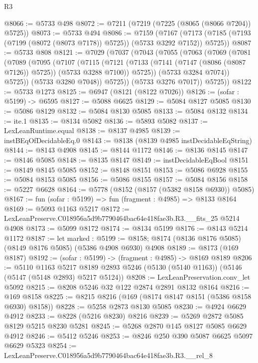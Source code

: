 \begin{lexlean}{R3}
\begin{coremodule}
@8066 := @5733 @498
@8072 := @7211 (@7219 (@7225 (@8065 (@8066 @7204)) @5725))
@8073 := @5733 @494
@8086 := @7159
    (@7167 (@7173 (@7185 (@7193 (@7199 (@8072 (@8073 @7178)) @5725)) (@5733 @3292 @7152)) @5725))
@8087 := @5733 @808
@8121 := @7029
    (@7037
      (@7043
        (@7055
          (@7063
            (@7069
              (@7081
                (@7089
                  (@7095
                    (@7107
                      (@7115
                        (@7121
                          (@7133 (@7141 (@7147 (@8086 (@8087 @7126)) @5725)) (@5733 @3288 @7100))
                          @5725))
                      (@5733 @3284 @7074))
                    @5725))
                (@5733 @3280 @7048))
              @5725))
          (@5733 @3276 @7017))
        @5725))
@8122 := @5733 @1273
@8125 := @6947 (@8121 (@8122 @7026))
@8126 := (sofar : @5199) -> @6595
@8127 := @5088 @6625
@8129 := @5084 @8127 @5085
@8130 := @5086 @8129
@8132 := @5084 @8130 @5085
@8133 := @5084 @8132
@8134 := ite.{1}
@8135 := @8134 @5082
@8136 := @5893 @5082
@8137 := LexLeanRuntime.equal
@8138 := @8137 @4985
@8139 := instBEqOfDecidableEq.{0}
@8143 := @8138 (@8139 @4985 instDecidableEqString)
@8144 := @8143 @4908
@8145 := @8144 @1172
@8146 := @8136 @8145
@8147 := @8146 @5085
@8148 := @8135 @8147
@8149 := instDecidableEqBool
@8151 := @8149 @8145 @5085
@8152 := @8148 @8151
@8153 := @5086 @6928
@8155 := @5084 @8153 @5085
@8156 := @5086 @8155
@8157 := @5084 @8156
@8158 := @5227 @6628
@8164 := @5778 (@8152 (@8157 (@5382 @8158 @6930)) @5085)
@8167 := fun (sofar : @5199) => fun (fragment : @4985) => @8133 @8164
@8169 := @5093 @1163 @5217
@8172 := LexLeanPreserve.C018956a5d9b7790464bac64e418fae3b.R3.__fits_25 @5214 @4908
@8173 := @5099 @8172
@8174 := @8134 @5199
@8176 := @8143 @5214 @1172
@8187 := let marked : @5199 := @8158;
  @8174 (@8136 @8176 @5085) (@8149 @8176 @5085) (@5386 @4908 @6930) @4908
@8189 := @8173 (@169 @8187)
@8192 := (sofar : @5199) -> (fragment : @4985) -> @8169 @8189
@8206 := @5110
    @1163
    @5217
    @8189
    @2893
    @5246
    (@5130 (@5140 @1163))
    (@5146 (@5147 (@5148 @2893) @5217 @5124))
@8208 := LexLeanPreservation.conv_let @5092
@8215 := @8208 @5246 @32 @122 @2874 @2891 @8132 @8164
@8216 := @169 @8158
@8225 := @8215 @8216 (@169 (@8174 @8147 @8151 (@5386 @8158 @6930) @8158))
@8228 := @5258 @2873 @8130 @5085
@8230 := @4924 @6629 @4912
@8233 := @8228 (@5216 @8230) @8216
@8239 := @5269 @2872 @5085 @8129 @5215 @8230 @5281
@8245 := @5268 @2870 @145 @8127 @5085 @6629 @4912
@8246 := @5412 @5246
@8253 := @8246 @250 @390 @5087 @6625 @5097 @6629 @5323
@8254 := LexLeanPreserve.C018956a5d9b7790464bac64e418fae3b.R3.__rel_8

\end{coremodule}
\end{lexlean}
